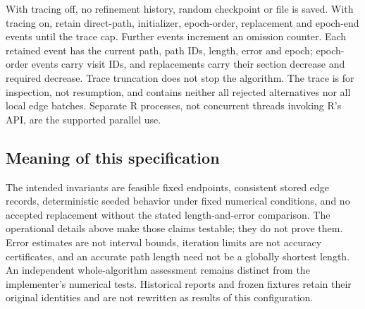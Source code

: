 \documentclass[11pt,letterpaper]{article}
\begin{document}
With tracing off, no refinement history, random checkpoint or file is saved.
With tracing on, retain direct-path, initializer, epoch-order, replacement
and epoch-end events until the trace cap. Further events increment an omission
counter. Each retained event has the current path, path IDs, length, error
and epoch; epoch-order events carry visit IDs, and replacements carry their
section decrease and required decrease. Trace truncation does not stop the
algorithm. The trace is for inspection, not resumption, and contains neither
all rejected alternatives nor all local edge batches. Separate R processes,
not concurrent threads invoking R's API, are the supported parallel use.

\subsection{Meaning of this specification}

The intended invariants are feasible fixed endpoints, consistent stored edge
records, deterministic seeded behavior under fixed numerical conditions,
and no accepted replacement without the stated length-and-error comparison.
The operational details above make those claims testable; they do not prove
them. Error estimates are not interval bounds, iteration limits are not
accuracy certificates, and an accurate path length need not be a globally
shortest length. An independent whole-algorithm assessment remains distinct
from the implementer's numerical tests. Historical reports and frozen
fixtures retain their original identities and are not rewritten as results
of this configuration.

\begingroup\small\raggedright


\endgroup
\end{document}
